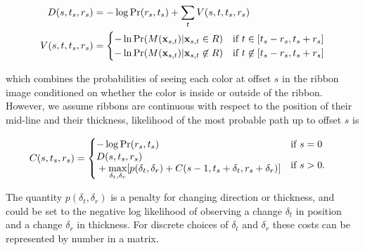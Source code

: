 \begin{align}
D(s, t_s, r_s) &= -\log \Pr(r_s, t_s)  + \sum_{t} V(s,t, t_s, r_s) \\
V(s, t, t_s, r_s) &= 
\begin{cases}
 -\ln\Pr(M(\mathbf{x}_{s,t})|\mathbf{x}_{s,t} \in R) &\text{if } t\in [t_s-r_s, t_s+r_s]\\
 -\ln\Pr(M(\mathbf{x}_{s,t})|\mathbf{x}_{s,t}\not\in R) &\text{if } t\not\in[t_s-r_s, t_s+r_s]
\end{cases}
\end{align}

which combines the probabilities of seeing each color at offset $s$ in the ribbon image conditioned on whether the color is inside or outside of the ribbon. However, we assume ribbons are continuous with respect to the position of their mid-line and their thickness, likelihood of the most probable path up to offset $s$ is 

\begin{align}
C(s, t_s, r_s) &=  \begin{cases}
-\log \Pr(r_s, t_s) & \text{if } s = 0\\
   \begin{aligned}
   & D(s, t_s, r_s) \\ 
   & + \displaystyle\max_{\delta_t,\delta_r} [p(\delta_t, \delta_r)+C(s-1, t_s+\delta_t, r_s+\delta_r)]
   \end{aligned} & \text{if } s > 0.\\
\end{cases}
\end{align}

The quantity $p(\delta_t, \delta_r)$ is a penalty for changing direction or thickness, and could be set to the negative log likelihood of observing a change $\delta_t$ in position and a change $\delta_r$ in thickness.  For discrete choices of $\delta_t$ and $\delta_r$ these costs can be represented by number in a matrix.




